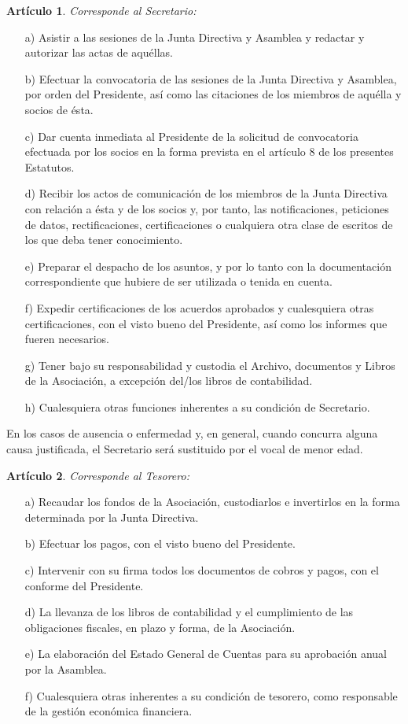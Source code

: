 \documentclass[a4paper,12pt]{article}
\theoremstyle{mystyle}		%
\newtheorem{art}{Artículo}	%
\begin{document}
\begin{onehalfspace}
\begin{art}
Corresponde al Secretario:
\end{art}
\begin{itemize}
\item [a)] Asistir a las sesiones de la Junta Directiva y Asamblea y redactar y autorizar las actas de aquéllas.
\item [b)] Efectuar la convocatoria de las sesiones de la Junta Directiva y Asamblea, por orden del Presidente, así como las citaciones de los miembros de aquélla y socios de ésta.
\item [c)] Dar cuenta inmediata al Presidente de la solicitud de convocatoria efectuada por los socios en la forma prevista en el artículo 8 de los presentes Estatutos.
\item [d)] Recibir los actos de comunicación de los miembros de la Junta Directiva con relación a ésta y de los socios y, por tanto, las notificaciones, peticiones de datos, rectificaciones, certificaciones o cualquiera otra clase de escritos de los que deba tener conocimiento.
\item [e)] Preparar el despacho de los asuntos, y por lo tanto con la documentación correspondiente que hubiere de ser utilizada o tenida en cuenta.
\item [f)] Expedir certificaciones de los acuerdos aprobados y cualesquiera otras certificaciones, con el visto bueno del Presidente, así como los informes que fueren necesarios.
\item [g)] Tener bajo su responsabilidad y custodia el Archivo, documentos y Libros de la Asociación, a excepción del/los libros de contabilidad.
\item [h)] Cualesquiera otras funciones inherentes a su condición de Secretario.
\end{itemize}

En los casos de ausencia o enfermedad y, en general, cuando concurra alguna causa justificada, el Secretario será sustituido por el vocal de menor edad.

\begin{art}
Corresponde al Tesorero:
\end{art}
\begin{itemize}
\item [a)] Recaudar los fondos de la Asociación, custodiarlos e invertirlos en la forma determinada por la Junta Directiva.
\item [b)] Efectuar los pagos, con el visto bueno del Presidente.
\item [c)] Intervenir con su firma todos los documentos de cobros y pagos, con el conforme del Presidente.
\item [d)] La llevanza de los libros de contabilidad y el cumplimiento de las obligaciones fiscales, en plazo y forma, de la Asociación.
\item [e)] La elaboración del Estado General de Cuentas para su aprobación anual por la Asamblea.
\item [f)] Cualesquiera otras inherentes a su condición de tesorero, como responsable de la gestión económica financiera.
\end{itemize}


\end{onehalfspace}
\end{document}
